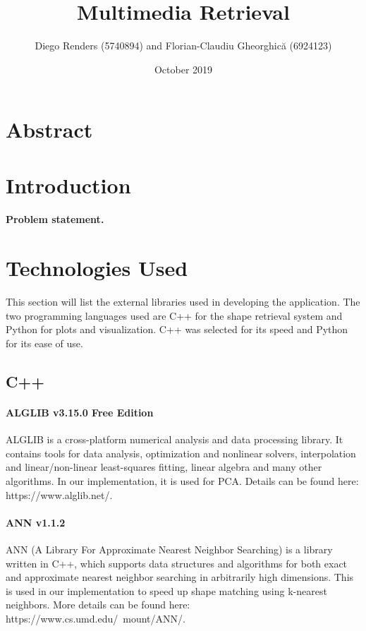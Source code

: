 \documentclass{bigdata}
\title{Multimedia Retrieval}
\author{Diego Renders (5740894) and Florian-Claudiu Gheorghică (6924123)}
\date{October 2019}
\begin{document}
\maketitle
\section*{Abstract}

\newpage

\section{Introduction}

\paragraph*{Problem statement.}

\newpage

\section{Technologies Used}
This section will list the external libraries used in developing the application. The two programming languages used are C++ for the shape retrieval system and Python for plots and visualization. C++ was selected for its speed and Python for its ease of use.
\subsection{C++}
\paragraph{ALGLIB v3.15.0 Free Edition}
ALGLIB is a cross-platform numerical analysis and data processing library. It contains tools for data analysis, optimization and nonlinear solvers, interpolation and linear/non-linear least-squares fitting, linear algebra and many other algorithms. In our implementation, it is used for PCA. Details can be found here: https://www.alglib.net/.
\paragraph{ANN v1.1.2}
ANN (A Library For Approximate Nearest Neighbor Searching) is a library written in C++, which supports data structures and algorithms for both exact and approximate nearest neighbor searching in arbitrarily high dimensions. This is used in our implementation to speed up shape matching using k-nearest neighbors. More details can be found here: https://www.cs.umd.edu/~mount/ANN/.
\end{document}
